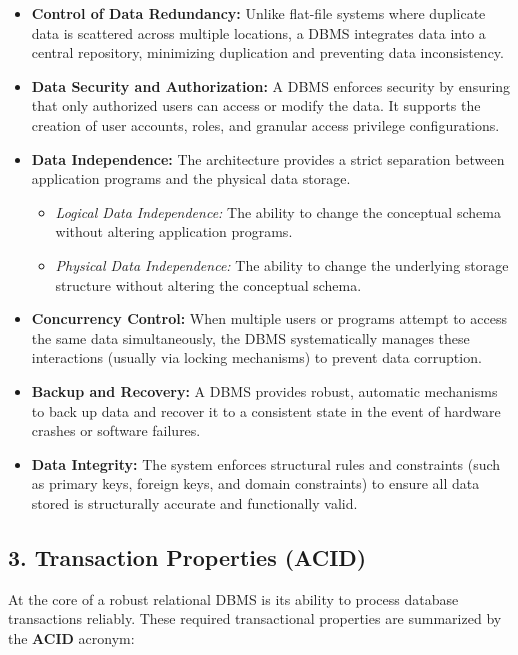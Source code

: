\documentclass[12pt,a3paper]{article}
\begin{document}
\begin{enumerate}
\begin{tcolorbox}[enhanced,breakable,ansbox,colback=cA!4,colframe=cA,boxrule=0.8pt,arc=5pt,title={\textbf{Answer}},fonttitle=\bfseries\color{white},colbacktitle=cA]
\begin{itemize}
    \item \textbf{Control of Data Redundancy:} Unlike flat-file systems where duplicate data is scattered across multiple locations, a DBMS integrates data into a central repository, minimizing duplication and preventing data inconsistency.
    \item \textbf{Data Security and Authorization:} A DBMS enforces security by ensuring that only authorized users can access or modify the data. It supports the creation of user accounts, roles, and granular access privilege configurations.
    \item \textbf{Data Independence:} The architecture provides a strict separation between application programs and the physical data storage. 
    \begin{itemize}
        \item \textit{Logical Data Independence:} The ability to change the conceptual schema without altering application programs.
        \item \textit{Physical Data Independence:} The ability to change the underlying storage structure without altering the conceptual schema.
    \end{itemize}
    \item \textbf{Concurrency Control:} When multiple users or programs attempt to access the same data simultaneously, the DBMS systematically manages these interactions (usually via locking mechanisms) to prevent data corruption.
    \item \textbf{Backup and Recovery:} A DBMS provides robust, automatic mechanisms to back up data and recover it to a consistent state in the event of hardware crashes or software failures.
    \item \textbf{Data Integrity:} The system enforces structural rules and constraints (such as primary keys, foreign keys, and domain constraints) to ensure all data stored is structurally accurate and functionally valid.
\end{itemize}

\subsection*{3. Transaction Properties (ACID)}
At the core of a robust relational DBMS is its ability to process database transactions reliably. These required transactional properties are summarized by the \textbf{ACID} acronym:


\end{tcolorbox}
\end{enumerate}
\end{document}

